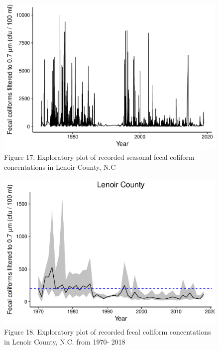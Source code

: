 \documentclass[12pt,]{article}
\begin{document}
\begin{figure}
\centering
\includegraphics{Edmondson_ENV872_Project_files/figure-latex/unnamed-chunk-16-1.pdf}
\caption{Figure 17. Exploratory plot of recorded seasonal fecal coliform
concentations in Lenoir County, N.C}
\end{figure}

\begin{figure}
\centering
\includegraphics{Edmondson_ENV872_Project_files/figure-latex/unnamed-chunk-17-1.pdf}
\caption{Figure 18. Exploratory plot of recorded fecal coliform
concentations in Lenoir County, N.C. from 1970- 2018}
\end{figure}
\end{document}
